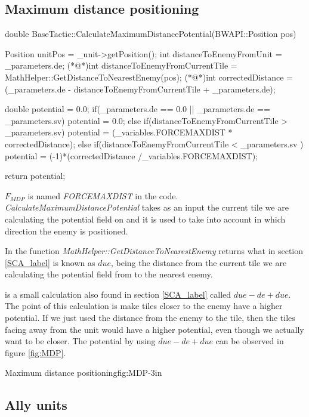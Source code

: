 {	\subsection{Maximum distance positioning}
		\begin{Sourcecode}[caption=Maximum distance]
double BaseTactic::CalculateMaximumDistancePotential(BWAPI::Position pos)
{
	Position unitPos = _unit->getPosition();
	int distanceToEnemyFromUnit = _parameters.de;
	(*@\lnote@*)int distanceToEnemyFromCurrentTile = MathHelper::GetDistanceToNearestEnemy(pos);
	(*@\lnote@*)int correctedDistance = (_parameters.de - distanceToEnemyFromCurrentTile + _parameters.de);

	double potential = 0.0;
	if(_parameters.de == 0.0 || _parameters.de == _parameters.sv)
		potential = 0.0;
	else if(distanceToEnemyFromCurrentTile > _parameters.sv)
		potential = (_variables.FORCEMAXDIST * correctedDistance);
	else if(distanceToEnemyFromCurrentTile < _parameters.sv )
		potential = (-1)*(correctedDistance /_variables.FORCEMAXDIST);
	
	return potential;
}
\end{Sourcecode}
	$F_{MDP}$ is named \textit{FORCEMAXDIST} in the code.
	\textit{CalculateMaximumDistancePotential} takes as an input the current tile we are calculating the potential field on and it is used to take into account in which direction the enemy is positioned.
	
	In  the function \textit{MathHelper::GetDistanceToNearestEnemy} returns what in section \ref{SCA_label} is known as $due$, being the distance from the current tile we are calculating the potential field from to the nearest enemy.
	
	 is a small calculation also found in section \ref{SCA_label} called $due - de + due$. The point of this calculation is make tiles closer to the enemy have a higher potential. If we just used the distance from the enemy to the tile, then the tiles facing away from the unit would have a higher potential, even though we actually want to be closer. The potential by using $due - de + due$ can be observed in figure \ref{fig:MDP}.
	
			{Maximum distance positioning}{fig:MDP}{-3in}
		
	\subsection{Ally units}
	
}
